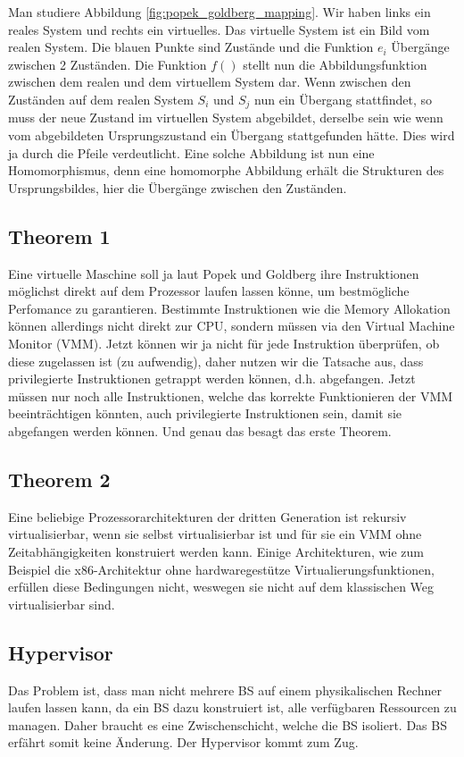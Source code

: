 Man studiere Abbildung \ref{fig:popek_goldberg_mapping}. Wir haben links ein reales System und rechts ein virtuelles. Das virtuelle System ist ein Bild vom realen System. Die blauen Punkte sind Zustände und die Funktion $ e_{i} $ Übergänge zwischen 2 Zuständen. Die Funktion $ f() $ stellt nun die Abbildungsfunktion zwischen dem realen und dem virtuellem System dar. Wenn zwischen den Zuständen auf dem realen System $ S_{i} $ und $ S_{j} $ nun ein Übergang stattfindet, so muss der neue Zustand im virtuellen System abgebildet, derselbe sein wie wenn vom abgebildeten Ursprungszustand ein Übergang stattgefunden hätte. Dies wird ja durch die Pfeile verdeutlicht. Eine solche Abbildung ist nun eine Homomorphismus, denn eine homomorphe Abbildung erhält die Strukturen des Ursprungsbildes, hier die Übergänge zwischen den Zuständen.

\subsection{Theorem 1}
\label{sec:poppek-goldberg-theorem1}
Eine virtuelle Maschine soll ja laut Popek und Goldberg ihre Instruktionen möglichst direkt auf dem Prozessor laufen lassen könne, um bestmögliche Perfomance zu garantieren. Bestimmte Instruktionen wie die Memory Allokation können allerdings nicht direkt zur CPU, sondern müssen via den Virtual Machine Monitor (VMM). Jetzt können wir ja nicht für jede Instruktion überprüfen, ob diese zugelassen ist (zu aufwendig), daher nutzen wir die Tatsache aus, dass privilegierte Instruktionen getrappt werden können, d.h. abgefangen. Jetzt müssen nur noch alle Instruktionen, welche das korrekte Funktionieren der VMM beeinträchtigen könnten, auch privilegierte Instruktionen sein, damit sie abgefangen werden können. Und genau das besagt das erste Theorem.

\subsection{Theorem 2}
Eine beliebige Prozessorarchitekturen der dritten Generation ist rekursiv virtualisierbar, wenn sie selbst virtualisierbar ist und für sie ein VMM ohne Zeitabhängigkeiten konstruiert werden kann.
Einige Architekturen, wie zum Beispiel die x86-Architektur ohne hardwaregestütze Virtualierungsfunktionen, erfüllen diese Bedingungen nicht, weswegen sie nicht auf dem klassischen Weg virtualisierbar sind.
\subsection{Hypervisor}
Das Problem ist, dass man nicht mehrere BS auf einem physikalischen Rechner laufen lassen kann, da ein BS dazu konstruiert ist, alle verfügbaren Ressourcen zu managen. Daher braucht es eine Zwischenschicht, welche die BS isoliert. Das BS erfährt somit keine Änderung. Der Hypervisor kommt zum Zug.

